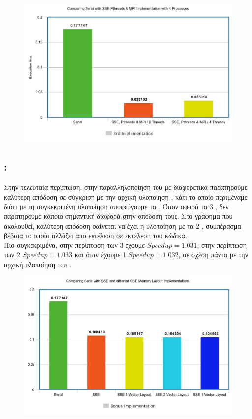 \documentclass{article}
\begin{document}
\begin{figure}[h!]
\centering
  \includegraphics[width=0.8\linewidth]{MPI4.jpeg}
  \caption{ }
\end{figure}

\newpage

\subsection{: }

Στην τελευταία περίπτωση, στην παραλληλοποίηση του  με διαφορετικά  παρατηρούμε καλύτερη απόδοση σε σύγκριση με την αρχική  υλοποίηση , κάτι το οποίο περιμέναμε διότι με τη συγκεκριμένη υλοποίηση αποφεύγουμε τα . Όσον αφορά τα 3 , δεν παρατηρούμε κάποια σημαντική διαφορά στην απόδοση τους. Στο γράφημα που ακολουθεί, καλύτερη απόδοση φαίνεται να έχει η υλοποίηση με τα 2 , συμπέρασμα βέβαια το οποίο αλλάζει απο εκτέλεση σε εκτέλεση του κώδικα.\\

Πιο συγκεκριμένα, στην περίπτωση των 3  έχουμε $Speedup = 1.031$, στην περίπτωση των 2  $Speedup = 1.033$ και όταν έχουμε 1  $Speedup = 1.032$, σε σχέση πάντα με την αρχική υλοποίηση του .\\
\vspace{12mm}
\begin{figure}[h!]
\centering 
  \includegraphics[width=0.8\linewidth]{BONUS.jpeg}
  \caption{ }
\end{figure}
\end{document}
